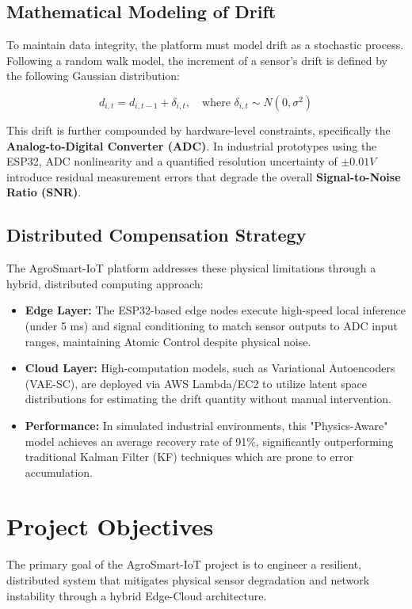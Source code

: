 \documentclass[conference]{IEEEtran}
\begin{document}
\subsection{Mathematical Modeling of Drift}
To maintain data integrity, the platform must model drift as a stochastic process. Following a random walk model, the increment of a sensor's drift is defined by the following Gaussian distribution:

\begin{equation}
    d_{i,t} = d_{i,t-1} + \delta_{i,t}, \quad \text{where } \delta_{i,t} \sim N(0, \sigma^2)
\end{equation}

This drift is further compounded by hardware-level constraints, specifically the \textbf{Analog-to-Digital Converter (ADC)}. In industrial prototypes using the ESP32, ADC nonlinearity and a quantified resolution uncertainty of $\pm 0.01 V $ introduce residual measurement errors that degrade the overall \textbf{Signal-to-Noise Ratio (SNR)}. 

\subsection{Distributed Compensation Strategy}
The AgroSmart-IoT platform addresses these physical limitations through a hybrid, distributed computing approach:
\begin{itemize}
    \item \textbf{Edge Layer:} The ESP32-based edge nodes execute high-speed local inference (under 5 ms) and signal conditioning to match sensor outputs to ADC input ranges, maintaining Atomic Control despite physical noise.
    \item \textbf{Cloud Layer:} High-computation models, such as Variational Autoencoders (VAE-SC), are deployed via AWS Lambda/EC2 to utilize latent space distributions for estimating the drift quantity without manual intervention.
    \item \textbf{Performance:} In simulated industrial environments, this "Physics-Aware" model achieves an average recovery rate of 91\%, significantly outperforming traditional Kalman Filter (KF) techniques which are prone to error accumulation.
\end{itemize}

\section{Project Objectives}
The primary goal of the AgroSmart-IoT project is to engineer a resilient, distributed system that mitigates physical sensor degradation and network instability through a hybrid Edge-Cloud architecture.
\end{document}
